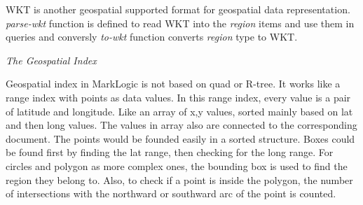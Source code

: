 \documentclass[a4paper,12pt]{article}
\begin{document}
WKT is another geospatial supported format for geospatial data representation. \textit{parse-wkt} function is defined to read WKT into the \textit{region} items and use them in queries and conversly \textit{to-wkt} function converts \textit{region} type to WKT.

\emph{The Geospatial Index}

Geospatial index in MarkLogic is not based on quad or R-tree. It works like a range index with points as data values. In this range index, every value is a pair of latitude and longitude. Like an array of x,y values, sorted mainly based on lat and then long values. The values in array also are connected to the corresponding document.
The points would be founded easily in a sorted structure. Boxes could be found first by finding the lat range, then checking for the long range. For circles and polygon as more complex ones, the bounding box is used to find the region they belong to. Also, to check if a point is inside the polygon, the number of intersections with the northward or southward arc of the point is counted. 
\end{document}
